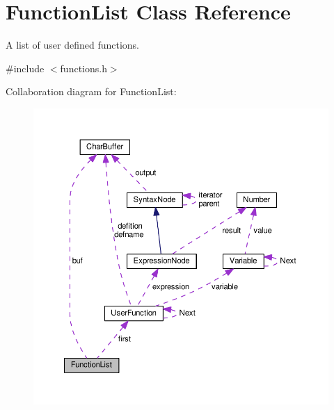 \hypertarget{classFunctionList}{}\section{Function\+List Class Reference}
\label{classFunctionList}


A list of user defined functions.  




{\ttfamily \#include $<$functions.\+h$>$}



Collaboration diagram for Function\+List\+:\nopagebreak
\begin{figure}[H]
\begin{center}
\leavevmode
\includegraphics[width=350pt]{classFunctionList__coll__graph}
\end{center}
\end{figure}
